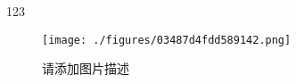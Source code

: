 
123

\begin{figure}[ht]
\centering
\texttt{[image: ./figures/03487d4fdd589142.png]}
\caption{请添加图片描述} \label{fig_test1_1}
\end{figure}
